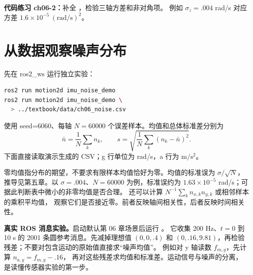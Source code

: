 \par\noindent\begin{minipage}{\linewidth}

\end{minipage}\par

\textbf{代码练习 ch06-2：}补全 ，检验三轴方差和非对角项。
例如 $\sigma_z=.004$ rad/s 对应方差 $1.6\times10^{-5}\ (\mathrm{rad/s})^2$。

\section{从数据观察噪声分布}
先在 ros2\_ws 运行独立实验：
\begin{lstlisting}[language=bash,numbers=none]
ros2 run motion2d imu_noise_demo
ros2 run motion2d imu_noise_demo \
  > ../textbook/data/ch06_noise.csv
\end{lstlisting}
使用 seed=6060、每轴 $N=60000$ 个误差样本。均值和总体标准差分别为
\begin{equation}
\bar n=\frac1N\sum_k n_k,\qquad
s=\sqrt{\frac1N\sum_k(n_k-\bar n)^2}.
\end{equation}
下面直接读取演示生成的 CSV；g 行单位为 rad/s，a 行为 $\mathrm{m/s^2}$。
\begin{center}
\end{center}
零均值指分布的期望，不要求有限样本均值恰好为零。均值的标准误为 $\sigma/\sqrt N$，
推导见第五章。以 $\sigma=.004$、$N=60000$ 为例，标准误约为
$1.63\times10^{-5}$ rad/s；可据此判断表中微小的非零均值是否合理。
还可以计算 $N^{-1}\sum_k n_{x,k}n_{y,k}$ 或相邻样本的乘积平均值，
观察它们是否接近零。前者反映轴间相关性，后者反映时间相关性。

\textbf{真实 ROS 消息实验。}启动默认第 06 章场景后运行 。
它收集 200 Hz、$t=0$ 到 10 s 的 2001 条圆参考消息。先减掉理想值
$(0,0,.4)$ 和 $(0,.16,9.81)$，再检验残差；不要对包含运动的原始值直接求“噪声均值”。
例如对 y 轴读数 $f_{m,y}$，先计算 $n_{a,y}=f_{m,y}-.16$，
再对这些残差求均值和标准差。运动信号与噪声的分离，是读懂传感器实验的第一步。

